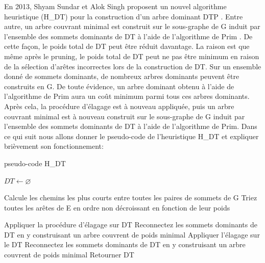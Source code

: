 En  2013, Shyam Sundar et Alok Singh proposent un nouvel algorithme heuristique (H\_DT) pour la construction d’un arbre dominant DTP \cite{sundar2013new}. Entre autre, un arbre couvrant minimal est construit sur le sous-graphe de G induit par l’ensemble des sommets dominants de DT à l’aide de l’algorithme de Prim \cite{prim1957shortest}. De cette façon, le poids total de DT peut être réduit davantage. La raison  est que même après le pruning, le poids total de DT peut ne pas être minimum en raison de la sélection d'arêtes incorrectes lors de la construction de DT. Sur un ensemble donné de sommets dominants, de nombreux arbres dominants peuvent être construits en G. De toute évidence, un arbre dominant obtenu à l’aide de l’algorithme de Prim aura un coût minimum parmi tous ces arbres dominants. Après cela, la procédure d’élagage est à nouveau appliquée, puis un arbre couvrant minimal est à nouveau construit sur le sous-graphe de G induit par l’ensemble des sommets dominants de DT à l’aide de l’algorithme de Prim. Dans ce qui suit nous allons donner le pseudo-code de l’heuristique H\_DT et expliquer brièvement son fonctionnement:\\

\begin{algorithm}[H]
\label{alg3:HDT}
\caption{ pseudo-code H\_DT}
\SetAlgoLined
\DontPrintSemicolon
\large


$DT \gets \varnothing $  \;


Calcule les chemins les plus courts entre toutes les paires de sommets de G \;
Triez toutes les arêtes de E en ordre non décroissant en fonction de leur poids \;


Appliquer la procédure d'élagage sur DT \;
Reconnectez les sommets dominants de DT en y construisant un arbre couvrent de poids minimal \;
Appliquer l'élagage sur le DT \; 
Reconnectez les sommets dominants de DT en y construisant un arbre couvrent de poids minimal \;
Retourner DT \;
\end{algorithm}

